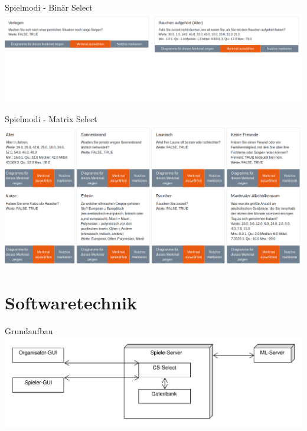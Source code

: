 \documentclass[xcolor=dvipsnames]{beamer}
\begin{document}
    \begin{frame}{Spielmodi - Binär Select}
        \includegraphics[width=\textwidth]{img/binary_select.png}
    \end{frame}
    \begin{frame}{Spielmodi - Matrix Select}
        \includegraphics[width=\textwidth]{img/matrix_select.png}
    \end{frame}

    \renewcommand{\arraystretch}{1.5}

	\section{Softwaretechnik}
	\begin{frame}{Grundaufbau}
	\centering
	\includegraphics[width=\textwidth]{img/Architektur.pdf}
	\end{frame}
\end{document}

